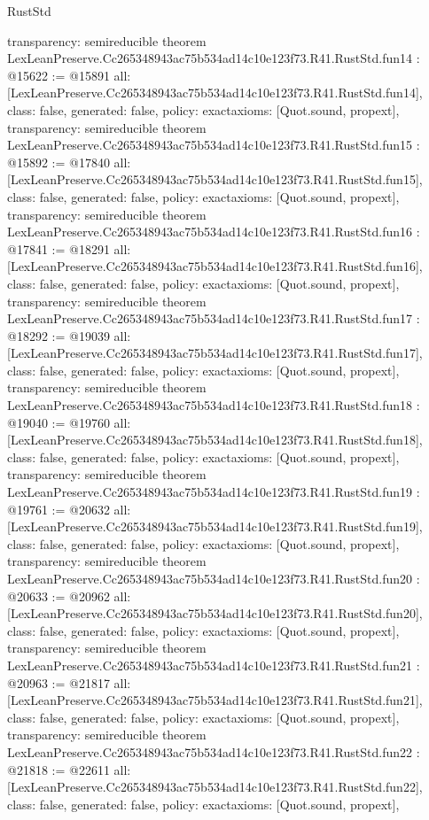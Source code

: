 \begin{lexlean}{RustStd}
\begin{coremodule}
{  transparency: semireducible
}
theorem LexLeanPreserve.Cc265348943ac75b534ad14c10e123f73.R41.RustStd.fun14 : @15622 := @15891 {
  all: [LexLeanPreserve.Cc265348943ac75b534ad14c10e123f73.R41.RustStd.fun14],
  class: false,
  generated: false,
  policy: exact{axioms: [Quot.sound, propext]},
  transparency: semireducible
}
theorem LexLeanPreserve.Cc265348943ac75b534ad14c10e123f73.R41.RustStd.fun15 : @15892 := @17840 {
  all: [LexLeanPreserve.Cc265348943ac75b534ad14c10e123f73.R41.RustStd.fun15],
  class: false,
  generated: false,
  policy: exact{axioms: [Quot.sound, propext]},
  transparency: semireducible
}
theorem LexLeanPreserve.Cc265348943ac75b534ad14c10e123f73.R41.RustStd.fun16 : @17841 := @18291 {
  all: [LexLeanPreserve.Cc265348943ac75b534ad14c10e123f73.R41.RustStd.fun16],
  class: false,
  generated: false,
  policy: exact{axioms: [Quot.sound, propext]},
  transparency: semireducible
}
theorem LexLeanPreserve.Cc265348943ac75b534ad14c10e123f73.R41.RustStd.fun17 : @18292 := @19039 {
  all: [LexLeanPreserve.Cc265348943ac75b534ad14c10e123f73.R41.RustStd.fun17],
  class: false,
  generated: false,
  policy: exact{axioms: [Quot.sound, propext]},
  transparency: semireducible
}
theorem LexLeanPreserve.Cc265348943ac75b534ad14c10e123f73.R41.RustStd.fun18 : @19040 := @19760 {
  all: [LexLeanPreserve.Cc265348943ac75b534ad14c10e123f73.R41.RustStd.fun18],
  class: false,
  generated: false,
  policy: exact{axioms: [Quot.sound, propext]},
  transparency: semireducible
}
theorem LexLeanPreserve.Cc265348943ac75b534ad14c10e123f73.R41.RustStd.fun19 : @19761 := @20632 {
  all: [LexLeanPreserve.Cc265348943ac75b534ad14c10e123f73.R41.RustStd.fun19],
  class: false,
  generated: false,
  policy: exact{axioms: [Quot.sound, propext]},
  transparency: semireducible
}
theorem LexLeanPreserve.Cc265348943ac75b534ad14c10e123f73.R41.RustStd.fun20 : @20633 := @20962 {
  all: [LexLeanPreserve.Cc265348943ac75b534ad14c10e123f73.R41.RustStd.fun20],
  class: false,
  generated: false,
  policy: exact{axioms: [Quot.sound, propext]},
  transparency: semireducible
}
theorem LexLeanPreserve.Cc265348943ac75b534ad14c10e123f73.R41.RustStd.fun21 : @20963 := @21817 {
  all: [LexLeanPreserve.Cc265348943ac75b534ad14c10e123f73.R41.RustStd.fun21],
  class: false,
  generated: false,
  policy: exact{axioms: [Quot.sound, propext]},
  transparency: semireducible
}
theorem LexLeanPreserve.Cc265348943ac75b534ad14c10e123f73.R41.RustStd.fun22 : @21818 := @22611 {
  all: [LexLeanPreserve.Cc265348943ac75b534ad14c10e123f73.R41.RustStd.fun22],
  class: false,
  generated: false,
  policy: exact{axioms: [Quot.sound, propext]},
}
\end{coremodule}
\end{lexlean}
